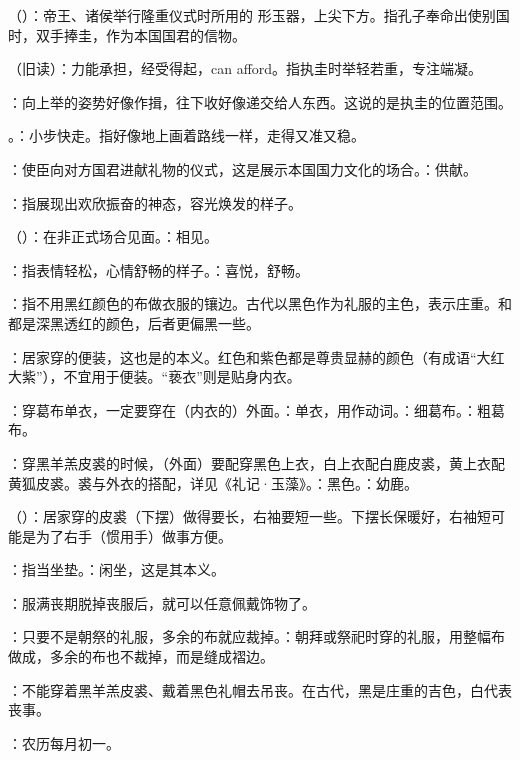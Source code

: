 {
\item {}（）：帝王、诸侯举行隆重仪式时所用的  形玉器，上尖下方。指孔子奉命出使别国时，双手捧圭，作为本国国君的信物。
\item {}（旧读）：力能承担，经受得起，can afford。指执圭时举轻若重，专注端凝。
\item {}：向上举的姿势好像作揖，往下收好像递交给人东西。这说的是执圭的位置范围。
\item {}。：小步快走。指好像地上画着路线一样，走得又准又稳。
\item {}：使臣向对方国君进献礼物的仪式，这是展示本国国力文化的场合。：供献。
\item {}：指展现出欢欣振奋的神态，容光焕发的样子。
\item {}（）：在非正式场合见面。：相见。
\item {}：指表情轻松，心情舒畅的样子。：喜悦，舒畅。
}
{}


{
\item {}：指不用黑红颜色的布做衣服的镶边。古代以黑色作为礼服的主色，表示庄重。和都是深黑透红的颜色，后者更偏黑一些。
\item {}：居家穿的便装，这也是的本义。红色和紫色都是尊贵显赫的颜色（有成语“大红大紫”），不宜用于便装。“亵衣”则是贴身内衣。
\item {}：穿葛布单衣，一定要穿在（内衣的）外面。：单衣，用作动词。：细葛布。：粗葛布。
\item {}：穿黑羊羔皮裘的时候，（外面）要配穿黑色上衣，白上衣配白鹿皮裘，黄上衣配黄狐皮裘。裘与外衣的搭配，详见《礼记·玉藻》。：黑色。：幼鹿。
\item {}（）：居家穿的皮裘（下摆）做得要长，右袖要短一些。下摆长保暖好，右袖短可能是为了右手（惯用手）做事方便。
\item {}：指当坐垫。：闲坐，这是其本义。
\item {}：服满丧期脱掉丧服后，就可以任意佩戴饰物了。
\item {}：只要不是朝祭的礼服，多余的布就应裁掉。：朝拜或祭祀时穿的礼服，用整幅布做成，多余的布也不裁掉，而是缝成褶边。
\item {}：不能穿着黑羊羔皮裘、戴着黑色礼帽去吊丧。在古代，黑是庄重的吉色，白代表丧事。
\item {}：农历每月初一。
}
{}


